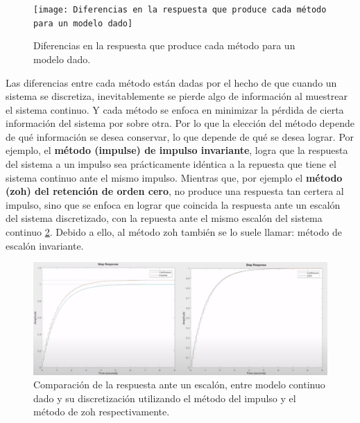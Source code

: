 \documentclass{article}
\begin{document}
\begin{sloppypar}
\begin{figure}[H]
    \centering
    \texttt{[image: Diferencias en la respuesta que produce cada método para un modelo dado]}
    \caption{Diferencias en la respuesta que produce cada método para un modelo dado.}
    \label{fig:Diferencias en la respuesta que produce cada método para un modelo dado}
\end{figure}

Las diferencias entre cada método están dadas por el hecho de que cuando un sistema se discretiza, inevitablemente se pierde algo de información al muestrear el sistema continuo. Y cada método se enfoca en minimizar la pérdida de cierta información del sistema por sobre otra. Por lo que la elección del método depende de qué información se desea conservar, lo que depende de qué se desea lograr.
Por ejemplo, el \textbf{método (impulse) de impulso invariante}, logra que la respuesta del sistema a un impulso sea prácticamente idéntica a la repuesta que tiene el sistema continuo ante el mismo impulso. Mientras que, por ejemplo el \textbf{método (zoh) del retención de orden cero}, no produce una respuesta tan certera al impulso, sino que se enfoca en lograr que coincida la respuesta ante un escalón del sistema discretizado, con la repuesta ante el mismo escalón del sistema continuo \ref{fig:Comparación de la respuesta ante un escalón, entre modelo continuo dado y su discretización utilizando el método del impulso y el método de zoh respectivamente}. Debido a ello, al método zoh también se lo suele llamar: método de escalón invariante.

\begin{figure}[H]
    \centering
    \includegraphics[width=1\textwidth]{Comparación de la respuesta ante un escalón, entre modelo continuo dado y su discretización utilizando el método del impulso y el método de zoh respectivamente}
    \caption{Comparación de la respuesta ante un escalón, entre modelo continuo dado y su discretización utilizando el método del impulso y el método de zoh respectivamente.}
    \label{fig:Comparación de la respuesta ante un escalón, entre modelo continuo dado y su discretización utilizando el método del impulso y el método de zoh respectivamente}
\end{figure}


\end{sloppypar}
\end{document}
